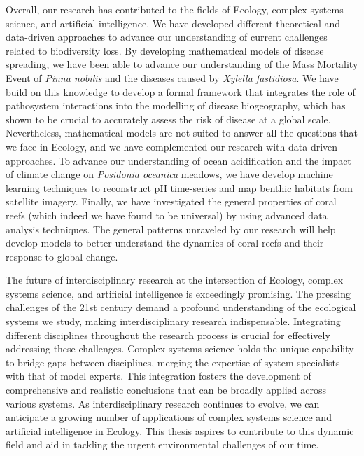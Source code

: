 Overall, our research has contributed to the fields of Ecology, complex systems
science, and artificial intelligence. We have developed different theoretical
and data-driven approaches to advance our understanding of current challenges
related to biodiversity loss. By developing mathematical models of disease
spreading, we have been able to advance our understanding of the Mass Mortality
Event of \textit{Pinna nobilis} and the diseases caused by \textit{Xylella
    fastidiosa}. We have build on this knowledge to develop a formal framework
that integrates the role of pathosystem interactions into the modelling of
disease biogeography, which has shown to be crucial to accurately assess the
risk of disease at a global scale. Nevertheless, mathematical models are not
suited to answer all the questions that we face in Ecology, and we have
complemented our research with data-driven approaches. To advance our
understanding of ocean acidification and the impact of climate change on
\textit{Posidonia oceanica} meadows, we have develop machine learning
techniques to reconstruct pH time-series and map benthic habitats from
satellite imagery. Finally, we have investigated the general properties of
coral reefs (which indeed we have found to be universal) by using advanced data
analysis techniques. The general patterns unraveled by our research will help
develop models to better understand the dynamics of coral reefs and their
response to global change.

The future of interdisciplinary research at the intersection of Ecology,
complex systems science, and artificial intelligence is exceedingly promising.
The pressing challenges of the 21st century demand a profound understanding of
the ecological systems we study, making interdisciplinary research
indispensable. Integrating different disciplines throughout the research
process is crucial for effectively addressing these challenges. Complex systems
science holds the unique capability to bridge gaps between disciplines, merging
the expertise of system specialists with that of model experts. This
integration fosters the development of comprehensive and realistic conclusions
that can be broadly applied across various systems. As interdisciplinary
research continues to evolve, we can anticipate a growing number of
applications of complex systems science and artificial intelligence in Ecology.
This thesis aspires to contribute to this dynamic field and aid in tackling the
urgent environmental challenges of our time.

\vfill